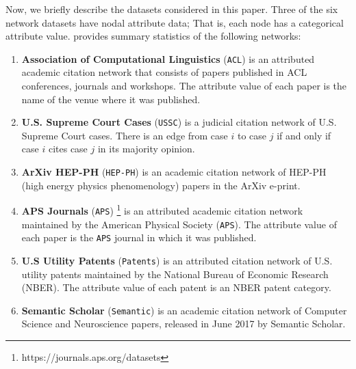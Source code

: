 Now, we briefly describe the datasets considered in this paper. Three of the six
network datasets have nodal attribute data; That is, each node has a categorical attribute value.
 provides summary statistics of the following networks:
\begin{enumerate}
    \item{\textbf{Association of Computational Linguistics}} (\texttt{ACL}) \cite{acldata} is an attributed academic citation network
    that consists of papers published in ACL conferences, journals and workshops.
    The attribute value of each paper is the name of the venue where it was published.


    \item{\textbf{U.S. Supreme Court Cases}} (\texttt{USSC}) \cite{fowler2008authority} is a judicial citation network of
    U.S. Supreme Court cases. There is an edge from case $i$ to case $j$ if and only if case $i$ cites case $j$ in its majority opinion.

    \item{\textbf{ArXiv HEP-PH}} (\texttt{HEP-PH}) \cite{gehrke2003overview} is an academic citation network of HEP-PH (high energy
    physics phenomenology) papers in the ArXiv e-print.

    \item{\textbf{APS Journals}} (\texttt{APS}) \footnote{https://journals.aps.org/datasets} is an attributed academic citation network maintained by
    the American Physical Society (\texttt{APS}).
    The attribute value of each paper is the \texttt{APS} journal in which it was published.

    \item{\textbf{U.S Utility Patents}} (\texttt{Patents}) \cite{leskovec2005graphs} is an attributed citation network of U.S. utility patents maintained by
    the National Bureau of Economic Research (NBER).
    The attribute value of each patent is an NBER patent category.

    \item{\textbf{Semantic Scholar}} (\texttt{Semantic}) \cite{ammar} is an academic citation network of
    Computer Science and Neuroscience papers, released in June 2017 by Semantic Scholar.
\end{enumerate}

